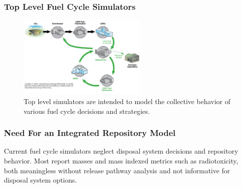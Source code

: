 

\begin{frame}[ctb!]
  \frametitle{Top Level Fuel Cycle Simulators}
  \begin{figure}[htbp!]
    \begin{center}
      \includegraphics[height=4cm]{simulations.eps}
    \end{center}
    \caption{Top level simulators are intended to model the collective 
    behavior of various fuel cycle decisions and 
    strategies.\cite{lisowski_global_2007}}
    \label{fig:simulation}
  \end{figure}
\end{frame}

\begin{frame}[ctb!]
  \frametitle{Need For an Integrated Repository Model}
  Current fuel cycle simulators neglect disposal system decisions and 
  repository behavior. Most report masses and mass indexed metrics such 
  as radiotoxicity, both meaningless without release pathway analysis
  and not informative for disposal system options.

  

\end{frame}

